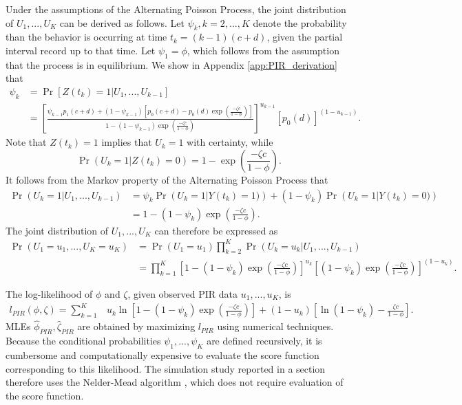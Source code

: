 \documentclass[man, noextraspace, floatsintext]{apa6}\usepackage[]{graphicx}\usepackage[]{color}
\begin{document}
Under the assumptions of the Alternating Poisson Process, the joint distribution of $U_1,...,U_K$ can be derived as follows. 
Let $\psi_k, k = 2,...,K$ denote the probability than the behavior is occurring at time $t_k = (k-1)(c + d)$, given the partial interval record up to that time. 
Let $\psi_1 = \phi$, which follows from the assumption that the process is in equilibrium. We show in Appendix \ref{app:PIR_derivation} that  
\begin{equation}
\label{eq:psi_k}
\begin{aligned}
\psi_k &= \Pr\left[ Z(t_k) = 1 \left| U_1,...,U_{k-1}\right.\right] \\
 &= \left[\frac{\psi_{k-1} p_1(c + d) + (1 - \psi_{k-1}) \left[p_0(c + d) - p_0(d) \exp\left(\frac{- \zeta c}{1 - \phi}\right)\right]}{1 - (1 - \psi_{k-1})\exp\left( \frac{-\zeta c}{1 - \phi}\right)}\right]^{u_{k-1}} \left[p_0(d)\right]^{(1 - u_{k-1})}.
\end{aligned}
\end{equation}
Note that $Z(t_k) = 1$ implies that $U_k = 1$ with certainty, while 
\[ \Pr\left(U_k = 1\left| Z(t_k) = 0\right.\right) = 1 - \exp\left( \frac{-\zeta c}{1 - \phi}\right).\]
It follows from the Markov property of the Alternating Poisson Process that 
\begin{align*}
\Pr\left(U_k = 1 \left| U_1,...,U_{k-1}\right.\right) &= \psi_k \Pr\left(U_k = 1 \left| Y(t_k) = 1)\right.\right)  + (1 - \psi_k)\Pr\left(U_k = 1 \left| Y(t_k) = 0)\right.\right) \\
&= 1 - (1 - \psi_k)\exp\left( \frac{-\zeta c}{1 - \phi}\right).
\end{align*}
The joint distribution of $U_1,...,U_K$ can therefore be expressed as 
\begin{align*}
\Pr\left(U_1=u_1,...,U_K = u_K\right) &= \Pr\left(U_1=u_1\right) \prod_{k=2}^K \Pr\left(U_k=u_k \left| U_1,...,U_{k-1}\right.\right) \nonumber \\
&= \prod_{k=1}^K \left[1 - (1 - \psi_k)\exp\left( \frac{-\zeta c}{1 - \phi}\right) \right]^{u_k} \left[(1 - \psi_k)\exp\left( \frac{-\zeta c}{1 - \phi}\right)\right]^{(1 - u_k)}.
\end{align*}

The log-likelihood of $\phi$ and $\zeta$, given observed PIR data $u_1,...,u_K$, is
\begin{align}
\label{eq:PIR_loglik}
l_{PIR}\left(\phi,\zeta\right) = \sum_{k=1}^K & u_k \ln\left[1 - (1 - \psi_k)\exp\left( \frac{-\zeta c}{1 - \phi}\right)\right]  + (1 - u_k)\left[\ln\left(1 - \psi_k \right) - \frac{\zeta c}{1 - \phi}\right].
\end{align}
MLEs $\hat\phi_{PIR}, \hat\zeta_{PIR}$ are obtained by maximizing $l_{PIR}$ using numerical techniques. 
Because the conditional probabilities $\psi_1,...,\psi_K$ are defined recursively, it is cumbersome and computationally expensive to evaluate the score function corresponding to this likelihood. 
The simulation study reported in a section therefore uses the Nelder-Mead algorithm \citep{Nelder1965simplex}, which does not require evaluation of the score function.
\end{document}
